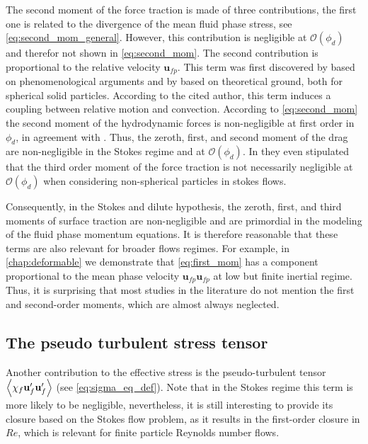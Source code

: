 The second moment of the force traction is made of three contributions, the first one is related to the divergence of the mean fluid phase stress, see \ref{eq:second_mom_general}. 
However, this contribution is negligible at $\mathcal{O}(\phi_d)$ \citep{jackson1997locally} and therefor not shown in \ref{eq:second_mom}.  
The second contribution is proportional to the relative velocity $\textbf{u}_{fp}$.
This term was first discovered by \citet{nozieres1987local} based on phenomenological arguments and by \citet{lhuillier1992volume} based on theoretical ground, both for spherical solid particles. 
According to the cited author, this term induces a coupling between relative motion and convection. 
According to \ref{eq:second_mom} the second moment of the hydrodynamic forces is non-negligible at first order in $\phi_d$, in agreement with \citep{jackson1997locally,zhang1997momentum}. 
Thus, the zeroth, first, and second moment of the drag are non-negligible in the Stokes regime and at $\mathcal{O}(\phi_d)$. 
In \citet{zhang1997momentum} they even stipulated that the third order moment of the force traction is not necessarily negligible at $\mathcal{O}(\phi_d)$ when considering non-spherical particles in stokes flows. 

Consequently, in the Stokes and dilute hypothesis, the zeroth, first, and third moments of surface traction are non-negligible and are primordial in the modeling of the fluid phase momentum equations. 
It is therefore reasonable that these terms are also relevant for broader flows regimes. 
For example, in \ref{chap:deformable} we demonstrate that \ref{eq:first_mom} has a component proportional to the mean phase velocity $\textbf{u}_{fp}\textbf{u}_{fp}$ at low but finite inertial regime. 
Thus, it is surprising that most studies in the literature do not mention the first and second-order moments, which are almost always neglected. 

\subsection{The pseudo turbulent stress tensor}

Another contribution to the effective stress is the pseudo-turbulent tensor $\left<\chi_f \textbf{u}_f'\textbf{u}_f'\right>$ (see \ref{eq:sigma_eq_def}). 
Note that in the Stokes regime this term is more likely to be negligible, nevertheless, it is still interesting to provide its closure based on the Stokes flow problem, as it results in the first-order closure in $Re$, which is relevant for finite particle Reynolds number flows.

